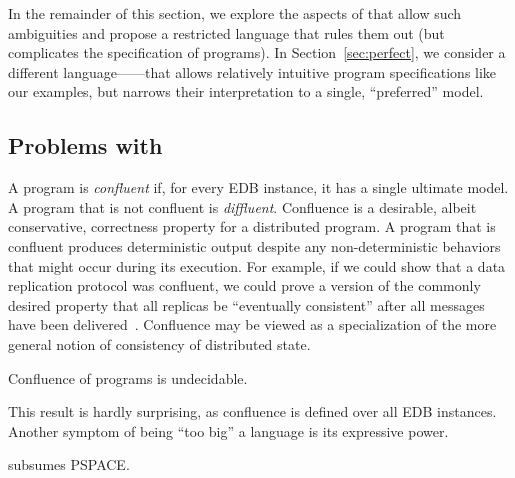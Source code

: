 In the remainder of this section, we explore the aspects of \lang that allow
such ambiguities and propose a restricted language \slang that rules them out
(but complicates the specification of programs).  In
Section~\ref{sec:perfect}, we consider a different language---\plang---that allows
relatively intuitive program specifications like our examples, but narrows their
interpretation to a single, ``preferred'' model.

\subsection{Problems with \large \bf \lang}

  A \lang program is {\em confluent} if, for every EDB instance, it has a single ultimate model.  A program that is not confluent is {\em diffluent}.
Confluence is a desirable, albeit conservative, correctness property for a
distributed program.  A program that is confluent produces deterministic output
despite any non-deterministic behaviors that might occur during its
execution. For example, if we could show that a data replication protocol was
confluent, we could prove a version of the commonly desired property that all
replicas be ``eventually consistent'' after all messages have been
delivered~\cite{bayou,doug-terry}.  Confluence may be viewed as a specialization of the
more general notion of consistency of distributed state.


\begin{lemma}
\label{lem:confluence-undecidable}
Confluence of \lang programs is undecidable.
\end{lemma}
This result is hardly surprising, as confluence is defined over all EDB instances.
Another symptom of \lang being ``too big'' a language is its expressive power. 

\begin{lemma}
\label{lem:lang-pspace}
\lang %
subsumes PSPACE.
\end{lemma}

